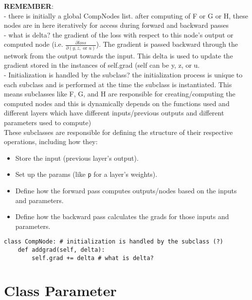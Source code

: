\documentclass{article}
\begin{document}
\textbf{REMEMBER}: \\
- there is initially a global CompNodes list. after computing of F or G or H, these nodes are in here iteratively for access during forward and backward passes \\
- what is delta? the gradient of the loss with respect to this node's output or computed node (i.e. $\frac{\partial loss}{\partial (y, z, \text{ or } u)}$). The gradient is passed backward through the network from the output towards the input. This delta is used to update the gradient stored in the instances of self.grad (self can be y, z, or u.\\
- Initialization is handled by the subclass? the initialization process is unique to each subclass and is performed at the time the subclass is instantiated. This means subclasses like F, G, and H are responsible for creating/computing the computed nodes and this is dynamically depends on the functions used and different layers which have different inputs/previous outputs and different parameters used to compute)\\
These subclasses are responsible for defining the structure of their respective operations, including how they:
\begin{itemize}
    \item Store the input (previous layer's output).
    \item Set up the params (like \verb|p| for a layer's weights).
    \item Define how the forward pass computes outputs/nodes based on the inputs and parameters.
    \item Define how the backward pass calculates the grads for those inputs and parameters.
\end{itemize}
 
\begin{verbatim}
class CompNode: # initialization is handled by the subclass (?)
    def addgrad(self, delta):
        self.grad += delta # what is delta?
\end{verbatim}

\section{Class Parameter}
\end{document}
